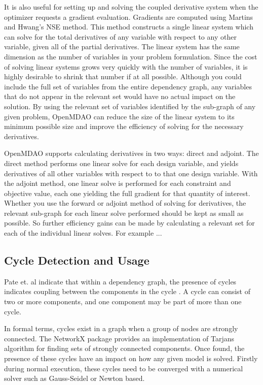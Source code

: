 \documentclass[]{aiaa-tc} %
\begin{document}
    It is also useful for setting up and solving the coupled derivative system when the optimizer requests
    a gradient evaluation. Gradients are computed using Martins and Hwang's NSE method\cite{Martins2012}. This 
    method constructs a single linear system which can solve for the total derivatives of any variable with 
    respect to any other variable, given all of the partial derivatives. The linear system has the same dimension 
    as the number of variables in your problem formulation. Since the cost of solving linear systems grows very 
    quickly with the number of variables, it is highly desirable to shrink that number if at all possible. 
    Although you could include the full set of variables from the entire dependency graph, any variables that do 
    not appear in the relevant set would have no actual impact on the solution. By using the relevant set 
    of variables identified by the sub-graph of any given problem, OpenMDAO can  
    reduce the size of the linear system to its minimum possible size and improve the efficiency 
    of solving for the necessary derivatives. 

    OpenMDAO supports calculating derivatives in two ways: direct and adjoint. The direct method performs 
    one linear solve for each design variable, and yields derivatives of all other variables with respect to 
    to that one design variable. With the adjoint method, one linear solve is performed for each constraint and 
    objective value, each one yielding the full gradient for that quantity of interest. Whether you use the forward 
    or adjoint method of solving for derivatives, the relevant sub-graph for each linear solve performed should be 
    kept as small as possible. So further efficiency gains can be made by calculating a relevant set for each 
    of the individual linear solves. For example ... 


    \subsection{Cycle Detection and Usage}
    Pate et. al indicate that within a dependency graph, the presence of cycles indicates coupling between 
    the components in the cycle \cite{graph_problem2013}. A cycle can consist of two or more components, and 
    one component may be part of more than one cycle. 

    In formal terms, cycles exist in a graph when a group of nodes are strongly connected. The NetworkX package 
    provides an implementation of Tarjans algorithm for finding sets of strongly connected 
    components\cite{tarjan1972depth,nuutila1994finding}. Once found, the presence of these cycles 
    have an impact on how any given model is solved. Firstly during normal execution, these cycles 
    need to be converged with a numerical solver such as Gauss-Seidel or Newton based. 
\end{document}
